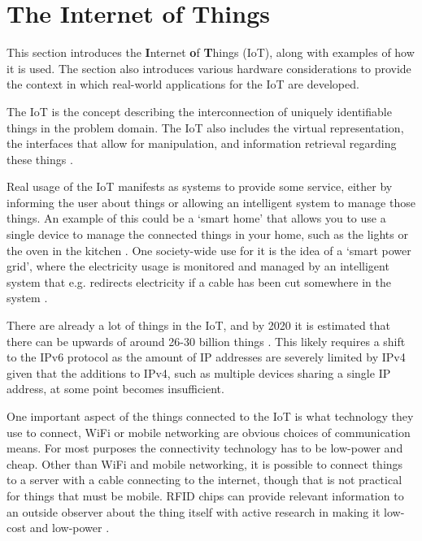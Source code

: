 \section{The Internet of Things}
This section introduces the \textbf{I}nternet \textbf{o}f \textbf{T}hings (IoT), along with examples of how it is used. 
The section also introduces various hardware considerations to provide the context in which real-world applications for the IoT are developed.

The IoT is the concept describing the interconnection of uniquely identifiable things in the problem domain.
The IoT also includes the virtual representation, the interfaces that allow for manipulation, and information retrieval regarding these things \citep{misc:InternetOfThingsDefinition, misc:InternetOfThingsDefinition2, misc:InternetOfThingsDefinition3}.

Real usage of the IoT manifests as systems to provide some service, either by informing the user about things or allowing an intelligent system to manage those things.
An example of this could be a `smart home' that allows you to use a single device to manage the connected things in your home, such as the lights or the oven in the kitchen \citep{misc:InternetOfThingsExamples}.
One society-wide use for it is the idea of a `smart power grid', where the electricity usage is monitored and managed by an intelligent system that e.g. redirects electricity if a cable has been cut somewhere in the system \citep{misc:smartGrid}.

There are already a lot of things in the IoT, and by 2020 it is estimated that there can be upwards of around 26-30 billion things \citep{misc:IoTGrowth1,misc:IoTGrowth2}.
This likely requires a shift to the IPv6 protocol as the amount of IP addresses are severely limited by IPv4 \citep{misc:numberOfAddresses} given that the additions to IPv4, such as multiple devices sharing a single IP address, at some point becomes insufficient.

One important aspect of the things connected to the IoT is what technology they use to connect, WiFi or mobile networking are obvious choices of communication means.
For most purposes the connectivity technology has to be low-power and cheap.
Other than WiFi and mobile networking, it is possible to connect things to a server with a cable connecting to the internet, though that is not practical for things that must be mobile.
RFID chips can provide relevant information to an outside observer about the thing itself \citep{misc:rfid} with active research in making it low-cost and low-power \citep{misc:rfid2}.


